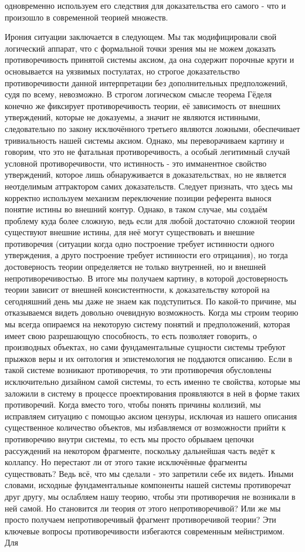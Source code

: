 \documentclass[12pt]{article}
\begin{document}
одновременно используем его следствия для доказательства его самого - что и произошло в современной теорией множеств.

Ирония ситуации заключается в следующем. Мы так модифицировали свой логический аппарат, что с формальной точки зрения мы не можем доказать противоречивость принятой системы аксиом, да она содержит порочные круги и основывается на уязвимых постулатах, но строгое доказательство противоречивости данной интерпретации без дополнительных предположений, судя по всему, невозможно. В строгом логическом смысле теорема Гёделя конечно же фиксирует противоречивость теории, её зависимость от внешних утверждений, которые не доказуемы, а значит не являются истинными, следовательно по закону исключённого третьего являются ложными, обеспечивает тривиальность нашей системы аксиом. Однако, мы переворачиваем картину и говорим, что это не фатальная противоречивость, а особый легитимный случай условной противоречивости, что истинность - это имманентное свойство утверждений, которое лишь обнаруживается в доказательствах, но не является неотделимым аттрактором самих доказательств. Следует признать, что здесь мы корректно используем механизм переключение позиции референта вынося понятие истины во внешний контур. Однако, в таком случае, мы создаём проблему куда более сложную, ведь если для любой достаточно сложной теории существуют внешние истины, для неё могут существовать и внешние противоречия (ситуации когда одно построение требует истинности одного утверждения, а друго построение требует истинности его отрицания), но тогда достоверность теории определяется не только внутренней, но и внешней непротиворечивостью. В итоге мы получаем картину, в которой достоверность теории зависит от внешней консистентности, к доказательству которой на сегодняшний день мы даже не знаем как подступиться. По какой-то причине, мы отказываемся видеть довольно очевидную возможность. Когда мы строим теорию мы всегда опираемся на некоторую систему понятий и предположений, которая имеет свою разрешающую способность, то есть позволяет говорить, о производных объектах, но сами фундаментальные сущности системы требуют прыжков веры и их онтология и эпистемология не поддаются описанию. Если в такой системе возникают противоречия, то эти противоречия обусловлены исключительно дизайном самой системы, то есть именно те свойства, которые мы заложили в систему в процессе проектирования проявляются в ней в форме таких противоречий. Когда вместо того, чтобы понять причины коллизий, мы исправляем ситуацию с помощью аксиом цензуры, исключая из нашего описания существенное количество объектов, мы избавляемся от возможности прийти к противоречию внутри системы, то есть мы просто обрываем цепочки рассуждений на некотором фрагменте, поскольку дальнейшая часть ведёт к коллапсу. Но перестают ли от этого такие исключённые фрагменты существовать? Ведь всё, что мы сделали - это запретили себе их видеть. Иными словами, исходные фундаментальные компоненты нашей системы противоречат друг другу, мы ослабляем нашу теорию, чтобы эти противоречия не возникали в ней самой. Но становится ли теория от этого непротиворечивой? Или же мы просто получаем непротиворечивый фрагмент противоречивой теории? Эти ключевые вопросы противоречивости избегаются современным мейнстримом. Для 
\end{document}
